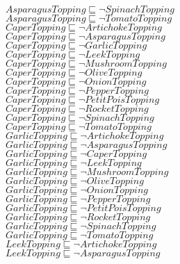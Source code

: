 \documentclass[a4paper,10pt]{article}
\begin{document}
 $AsparagusTopping \sqsubseteq  \lnot SpinachTopping$\\ 
 $AsparagusTopping \sqsubseteq  \lnot TomatoTopping$\\ 
 $CaperTopping \sqsubseteq  \lnot ArtichokeTopping$\\ 
 $CaperTopping \sqsubseteq  \lnot AsparagusTopping$\\ 
 $CaperTopping \sqsubseteq  \lnot GarlicTopping$\\ 
 $CaperTopping \sqsubseteq  \lnot LeekTopping$\\ 
 $CaperTopping \sqsubseteq  \lnot MushroomTopping$\\ 
 $CaperTopping \sqsubseteq  \lnot OliveTopping$\\ 
 $CaperTopping \sqsubseteq  \lnot OnionTopping$\\ 
 $CaperTopping \sqsubseteq  \lnot PepperTopping$\\ 
 $CaperTopping \sqsubseteq  \lnot PetitPoisTopping$\\ 
 $CaperTopping \sqsubseteq  \lnot RocketTopping$\\ 
 $CaperTopping \sqsubseteq  \lnot SpinachTopping$\\ 
 $CaperTopping \sqsubseteq  \lnot TomatoTopping$\\ 
 $GarlicTopping \sqsubseteq  \lnot ArtichokeTopping$\\ 
 $GarlicTopping \sqsubseteq  \lnot AsparagusTopping$\\ 
 $GarlicTopping \sqsubseteq  \lnot CaperTopping$\\ 
 $GarlicTopping \sqsubseteq  \lnot LeekTopping$\\ 
 $GarlicTopping \sqsubseteq  \lnot MushroomTopping$\\ 
 $GarlicTopping \sqsubseteq  \lnot OliveTopping$\\ 
 $GarlicTopping \sqsubseteq  \lnot OnionTopping$\\ 
 $GarlicTopping \sqsubseteq  \lnot PepperTopping$\\ 
 $GarlicTopping \sqsubseteq  \lnot PetitPoisTopping$\\ 
 $GarlicTopping \sqsubseteq  \lnot RocketTopping$\\ 
 $GarlicTopping \sqsubseteq  \lnot SpinachTopping$\\ 
 $GarlicTopping \sqsubseteq  \lnot TomatoTopping$\\ 
 $LeekTopping \sqsubseteq  \lnot ArtichokeTopping$\\ 
 $LeekTopping \sqsubseteq  \lnot AsparagusTopping$\\ 
\end{document}
